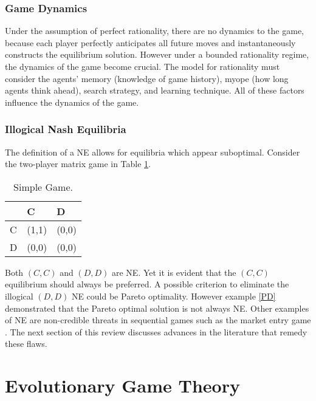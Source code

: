 \subsubsection{Game Dynamics}
Under the assumption of perfect rationality, there are no dynamics to the game, because each player perfectly anticipates all future moves and instantaneously constructs the equilibrium solution. However under a bounded rationality regime, the dynamics of the game become crucial. The model for rationality must consider the agents' memory (knowledge of game history), myope (how long agents think ahead), search strategy, and learning technique. All of these factors influence the dynamics of the game. \\

\subsubsection{Illogical Nash Equilibria}
The definition of a NE allows for equilibria which appear suboptimal. Consider the two-player matrix game in Table \ref{SG}.  \\

\begin{table}[hbt!] %
\begin{center}
\centering
\begin{tabular}{|l|l|l|}
\hline
  & C     & D     \\ \hline
C & (1,1) & (0,0) \\ \hline
D & (0,0) & (0,0) \\ \hline
\end{tabular}
\caption{Simple Game.
}
\label{SG}
\end{center}

\end{table}
Both $(C,C)$ and $(D,D)$ are NE. Yet it is evident that the $(C,C)$ equilibrium should always be preferred. A possible criterion to eliminate the illogical $(D,D)$ NE could be Pareto optimality. However example \ref{PD} demonstrated that the Pareto optimal solution is not always NE. Other examples of  NE are non-credible threats in sequential games such as the market entry game \cite{RN79}. The next section of this review discusses advances in the literature that remedy these flaws. \\


\section{Evolutionary Game Theory} \label{EGT}


